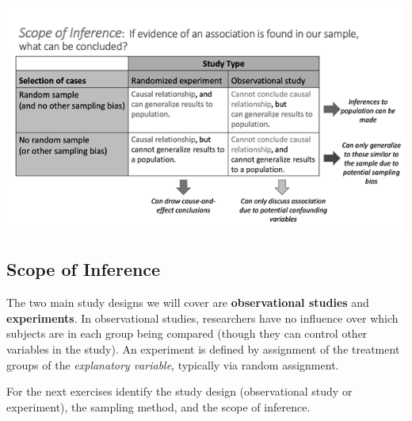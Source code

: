 \documentclass[
]{report}
\begin{document}
\begin{center}\includegraphics[width=0.75\linewidth]{images/ScopeOfInferenceGreyscale} \end{center}

\subsection{Scope of Inference}\label{scope-of-inference-2}

The two main study designs we will cover are \textbf{observational studies} and \textbf{experiments}. In observational studies, researchers have no influence over which subjects are in each group being compared (though they can control other variables in the study). An experiment is defined by assignment of the treatment groups of the \emph{explanatory variable}, typically via random assignment.

For the next exercises identify the study design (observational study or experiment), the sampling method, and the scope of inference.
\end{document}
